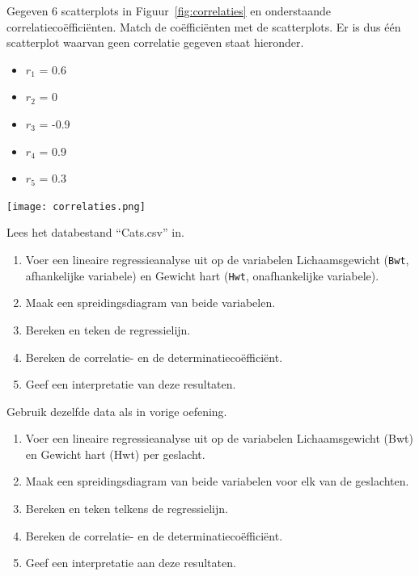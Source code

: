\begin{exercise}
  \label{ex:scatter-correlatiecoeff}
  Gegeven 6 scatterplots in Figuur~\ref{fig:correlaties} en onderstaande correlatieco\"effici\"enten. Match de co\"effici\"enten met de scatterplots. Er is dus één scatterplot waarvan geen correlatie gegeven staat hieronder.
  \begin{itemize}
    \item $r_{1}$ = 0.6
    \item $r_{2}$ = 0
    \item $r_{3}$ = -0.9
    \item $r_{4}$ = 0.9
    \item $r_{5}$ = 0.3
  \end{itemize}
  \texttt{[image: correlaties.png]}
  \label{fig:correlaties}
\end{exercise}

\begin{exercise}
  \label{ex:cats}
  Lees het databestand ``Cats.csv'' in. 
  \begin{enumerate}
    \item Voer een lineaire regressieanalyse uit op de variabelen Lichaamsgewicht (\texttt{Bwt}, afhankelijke variabele) en Gewicht hart (\texttt{Hwt}, onafhankelijke variabele).
    \item Maak een spreidingsdiagram van beide variabelen.
    \item Bereken en teken de regressielijn.
    \item Bereken de correlatie- en de determinatiecoëfficiënt.
    \item Geef een interpretatie van deze resultaten.
  \end{enumerate}
\end{exercise}

\begin{exercise}
  \label{ex:cats-per-geslacht}
  Gebruik dezelfde data als in vorige oefening.
  \begin{enumerate}
    \item Voer een lineaire regressieanalyse uit op de variabelen Lichaamsgewicht (Bwt) en Gewicht hart (Hwt) per geslacht.
    \item Maak een spreidingsdiagram van beide variabelen voor elk van de geslachten.
    \item Bereken en teken telkens de regressielijn.
    \item Bereken de correlatie- en de determinatiecoëfficiënt.
    \item Geef een interpretatie aan deze resultaten.
  \end{enumerate}
\end{exercise}

